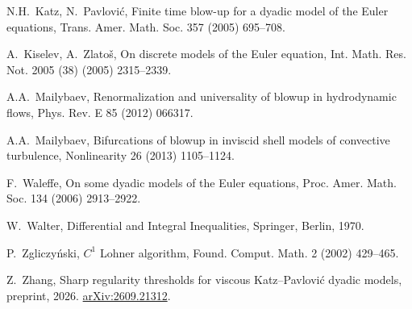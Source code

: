  N.H.~Katz, N.~Pavlovi\'c, Finite time blow-up for a dyadic
model of the Euler equations, Trans. Amer. Math. Soc. 357 (2005) 695--708.

 A.~Kiselev, A.~Zlato\v{s}, On discrete models of the Euler
equation, Int. Math. Res. Not. 2005 (38) (2005) 2315--2339.

 A.A.~Mailybaev, Renormalization and universality of blowup in
hydrodynamic flows, Phys. Rev. E 85 (2012) 066317.

 A.A.~Mailybaev, Bifurcations of blowup in inviscid shell
models of convective turbulence, Nonlinearity 26 (2013) 1105--1124.

 F.~Waleffe, On some dyadic models of the Euler equations,
Proc. Amer. Math. Soc. 134 (2006) 2913--2922.

 W.~Walter, Differential and Integral Inequalities, Springer,
Berlin, 1970. 

 P.~Zgliczy\'nski, $C^1$ Lohner algorithm, Found. Comput. Math.
2 (2002) 429--465. 

 Z.~Zhang, Sharp regularity thresholds for viscous
Katz--Pavlovi\'c dyadic models, preprint, 2026.
\href{https://arxiv.org/abs/2609.21312}{arXiv:2609.21312}.
